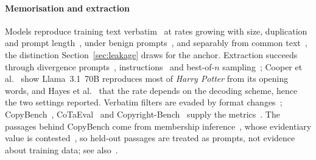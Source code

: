 \paragraph{Memorisation and extraction}
Models reproduce training text verbatim~\cite{carlini2021extracting} at rates growing with size, duplication and prompt length~\cite{carlini2023quantifying,huang2024demystifying}, under benign prompts~\cite{aerni2025nonadversarial}, and separably from common text~\cite{zhang2023counterfactual}, the distinction Section~\ref{sec:leakage} draws for the anchor. Extraction succeeds through divergence prompts~\cite{nasr2025scalable}, instructions~\cite{kassem2025alpaca} and best-of-$n$ sampling~\cite{ahmed2026extracting,hughes2024bestofn}; Cooper et al.~\cite{cooper2025extracting} show Llama~3.1~70B reproduces most of \emph{Harry Potter} from its opening words, and Hayes et al.~\cite{hayes2025measuring} that the rate depends on the decoding scheme, hence the two settings reported. Verbatim filters are evaded by format changes~\cite{ippolito2023preventing}; CopyBench~\cite{chen2024copybench}, CoTaEval~\cite{wei2024cotaeval} and Copyright-Bench~\cite{hui2026copyrightbench} supply the metrics~\cite{lin2004rouge,broder1997resemblance}. The passages behind CopyBench come from membership inference~\cite{shi2024detecting}, whose evidentiary value is contested~\cite{duan2024membership,ertan2026evidentiary,meeus2024traps,duarte2024decop}, so held-out passages are treated as prompts, not evidence about training data; see also~\cite{schwarzschild2024rethinking,karamolegkou2023copyright,freeman2024exploring,panaitescu2025watermarking}.


